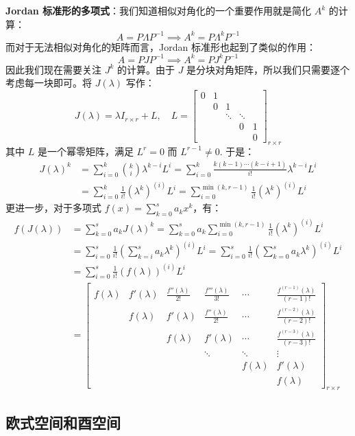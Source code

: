 \noindent\textbf{Jordan 标准形的多项式}：我们知道相似对角化的一个重要作用就是简化 $A^k$ 的计算：
\[A=P\Lambda P^{-1}\implies A^k=P\Lambda^kP^{-1}\]
而对于无法相似对角化的矩阵而言，Jordan 标准形也起到了类似的作用：
\[A=PJP^{-1}\implies A^k=PJ^kP^{-1}\]
因此我们现在需要关注 $J^k$ 的计算。由于 $J$ 是分块对角矩阵，所以我们只需要逐个考虑每一块即可。将 $J(\lambda)$ 写作：
\[
    J(\lambda)=\lambda I_{r\times r}+L
    ,\quad L=
    \begin{bmatrix}
    0&1&&&\\
    &0&1&&\\
    &&\ddots&\ddots&\\
    &&&0&1\\
    &&&&0
    \end{bmatrix}_{r\times r}
\]
其中 $L$ 是一个幂零矩阵，满足 $L^r=0$ 而 $L^{r-1}\neq 0$. 于是：
\begin{align*}
    J(\lambda)^k&=\sum_{i=0}^k\binom{k}{i}\lambda^{k-i}L^i=\sum_{i=0}^k\frac{k(k-1)\cdots(k-i+1)}{i!}\lambda^{k-i}L^i\\
    &=\sum_{i=0}^k\frac{1}{i!}(\lambda^k)^{(i)}L^i=\sum_{i=0}^{\min(k,r-1)}\frac{1}{i!}(\lambda^k)^{(i)}L^i
\end{align*}
更进一步，对于多项式 $f(x)=\sum_{k=0}^sa_kx^k$，有：
\begin{align*}
    f(J(\lambda))&=\sum_{k=0}^sa_kJ(\lambda)^k=\sum_{k=0}^sa_k\sum_{i=0}^{\min(k,r-1)}\frac{1}{i!}(\lambda^k)^{(i)}L^i\\
    &=\sum_{i=0}^{s}\frac{1}{i!}\left(\sum_{k=i}^sa_k\lambda^k\right)^{(i)}L^i=\sum_{i=0}^{s}\frac{1}{i!}\left(\sum_{k=0}^sa_k\lambda^k\right)^{(i)}L^i\\
    &=\sum_{i=0}^{s}\frac{1}{i!}\left(f(\lambda)\right)^{(i)}L^i\\
    &=\begin{bmatrix}
    f(\lambda)&f'(\lambda)&\frac{f''(\lambda)}{2!}&\frac{f'''(\lambda)}{3!}&\cdots&\frac{f^{(r-1)}(\lambda)}{(r-1)!}\\
    &f(\lambda)&f'(\lambda)&\frac{f''(\lambda)}{2!}&\cdots&\frac{f^{(r-2)}(\lambda)}{(r-2)!}\\
    &&f(\lambda)&f'(\lambda)&\cdots&\frac{f^{(r-3)}(\lambda)}{(r-3)!}\\
    &&&\ddots&\ddots&\vdots\\
    &&&&f(\lambda)&f'(\lambda)\\
    &&&&&f(\lambda)
    \end{bmatrix}_{r\times r}
\end{align*}


\subsection{欧式空间和酉空间}

